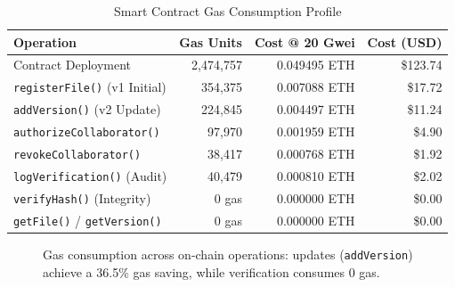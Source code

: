 \documentclass[10pt,conference,letterpaper]{IEEEtran}
\begin{document}
\begin{table}[htbp]
\centering
\caption{Smart Contract Gas Consumption Profile}
\label{tab:gas_profile}
\footnotesize
\setlength{\tabcolsep}{2.5pt}
\begin{tabular}{lrrr}
\toprule
\textbf{Operation} & \textbf{Gas Units} & \textbf{Cost @ 20 Gwei} & \textbf{Cost (USD)} \\
\midrule
Contract Deployment        & 2,474,757 & 0.049495 ETH & \$123.74 \\
\texttt{registerFile()} (v1 Initial) & 354,375   & 0.007088 ETH & \$17.72 \\
\texttt{addVersion()} (v2 Update)   & 224,845   & 0.004497 ETH & \$11.24 \\
\texttt{authorizeCollaborator()} & 97,970 & 0.001959 ETH & \$4.90 \\
\texttt{revokeCollaborator()}    & 38,417 & 0.000768 ETH & \$1.92 \\
\texttt{logVerification()} (Audit) & 40,479 & 0.000810 ETH & \$2.02 \\
\texttt{verifyHash()} (Integrity)  & 0 gas  & 0.000000 ETH & \$0.00 \\
\texttt{getFile()} / \texttt{getVersion()} & 0 gas & 0.000000 ETH & \$0.00 \\
\bottomrule
\end{tabular}
\end{table}

\begin{figure}[htbp]
\centering
{}
\caption{Gas consumption across on-chain operations: updates (\texttt{addVersion}) achieve a 36.5\% gas saving, while verification consumes 0 gas.}
\label{fig:gas_chart}
\end{figure}
\end{document}
